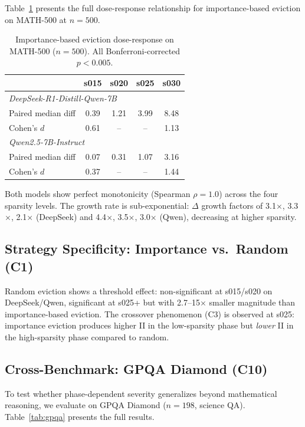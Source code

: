 \documentclass[11pt,a4paper]{article}
\begin{document}
Table~\ref{tab:dose_response} presents the full dose-response relationship for importance-based eviction on MATH-500 at $n=500$.

\begin{table}[h]
\centering
\caption{Importance-based eviction dose-response on MATH-500 ($n=500$). All Bonferroni-corrected $p < 0.005$.}
\label{tab:dose_response}
\begin{tabular}{lcccc}
\toprule
& \textbf{s015} & \textbf{s020} & \textbf{s025} & \textbf{s030} \\
\midrule
\multicolumn{5}{l}{\emph{DeepSeek-R1-Distill-Qwen-7B}} \\
Paired median diff & 0.39 & 1.21 & 3.99 & 8.48 \\
Cohen's $d$ & 0.61 & -- & -- & 1.13 \\
\midrule
\multicolumn{5}{l}{\emph{Qwen2.5-7B-Instruct}} \\
Paired median diff & 0.07 & 0.31 & 1.07 & 3.16 \\
Cohen's $d$ & 0.37 & -- & -- & 1.44 \\
\bottomrule
\end{tabular}
\end{table}

Both models show perfect monotonicity (Spearman $\rho = 1.0$) across the four sparsity levels. The growth rate is sub-exponential: $\Delta$ growth factors of 3.1$\times$, 3.3$\times$, 2.1$\times$ (DeepSeek) and 4.4$\times$, 3.5$\times$, 3.0$\times$ (Qwen), decreasing at higher sparsity.

\subsection{Strategy Specificity: Importance vs.\ Random (C1)}

Random eviction shows a threshold effect: non-significant at s015/s020 on DeepSeek/Qwen, significant at s025+ but with 2.7--15$\times$ smaller magnitude than importance-based eviction. The crossover phenomenon (C3) is observed at s025: importance eviction produces higher II in the low-sparsity phase but \emph{lower} II in the high-sparsity phase compared to random.

\subsection{Cross-Benchmark: GPQA Diamond (C10)}
\label{sec:gpqa}

To test whether phase-dependent severity generalizes beyond mathematical reasoning, we evaluate on GPQA Diamond ($n=198$, science QA). Table~\ref{tab:gpqa} presents the full results.
\end{document}
